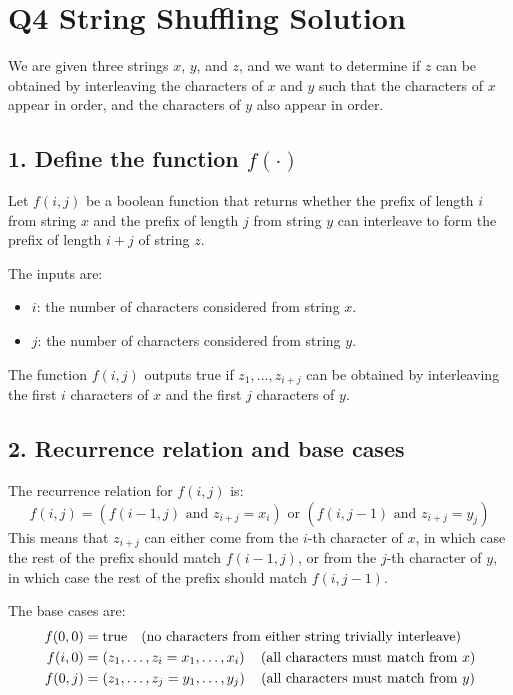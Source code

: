 \documentclass[11pt]{article}
\begin{document}
\section*{Q4 String Shuffling Solution}

We are given three strings \( x \), \( y \), and \( z \), and we want to determine if \( z \) can be obtained by interleaving the characters of \( x \) and \( y \) such that the characters of \( x \) appear in order, and the characters of \( y \) also appear in order.

\subsection*{1. Define the function \( f(\cdot) \)}
Let \( f(i, j) \) be a boolean function that returns whether the prefix of length \( i \) from string \( x \) and the prefix of length \( j \) from string \( y \) can interleave to form the prefix of length \( i + j \) of string \( z \).

The inputs are:
\begin{itemize}
    \item \( i \): the number of characters considered from string \( x \).
    \item \( j \): the number of characters considered from string \( y \).
\end{itemize}

The function \( f(i, j) \) outputs true if \( z_1, \dots, z_{i+j} \) can be obtained by interleaving the first \( i \) characters of \( x \) and the first \( j \) characters of \( y \).

\subsection*{2. Recurrence relation and base cases}
The recurrence relation for \( f(i, j) \) is:
\[
f(i, j) = \left( f(i-1, j) \text{ and } z_{i+j} = x_i \right) \text{ or } \left( f(i, j-1) \text{ and } z_{i+j} = y_j \right)
\]
This means that \( z_{i+j} \) can either come from the \( i \)-th character of \( x \), in which case the rest of the prefix should match \( f(i-1, j) \), or from the \( j \)-th character of \( y \), in which case the rest of the prefix should match \( f(i, j-1) \).

The base cases are:
\begin{align*}
f(0, 0) &= \text{true} \quad \text{(no characters from either string trivially interleave)} \\
f(i, 0) &= \left( z_1, \dots, z_i = x_1, \dots, x_i \right) \quad \text{(all characters must match from \( x \))} \\
f(0, j) &= \left( z_1, \dots, z_j = y_1, \dots, y_j \right) \quad \text{(all characters must match from \( y \))}
\end{align*}
\end{document}
